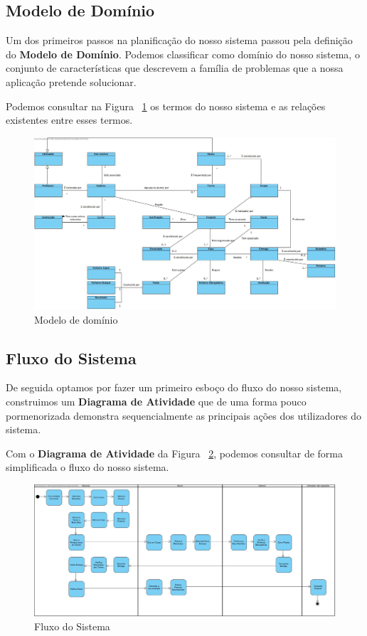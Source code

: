 \subsection{Modelo de Domínio}

Um dos primeiros passos na planificação do nosso sistema passou pela definição do \textbf{Modelo de Domínio}.
Podemos classificar como domínio do nosso sistema, o conjunto de características que descrevem a família de problemas que a nossa aplicação pretende solucionar.

Podemos consultar na Figura ~\ref{fig:modelo-dominio} os termos do nosso sistema e as relações existentes entre esses termos.

\begin{figure}[H] 
  \centering
  \includegraphics[width=1\textwidth,center]{images/arquitetura/modelo-dominio}
  \caption{Modelo de domínio}
  \label{fig:modelo-dominio}
\end{figure}

\subsection{Fluxo do Sistema}

De seguida optamos por fazer um primeiro esboço do fluxo do nosso sistema, construimos um \textbf{Diagrama de Atividade} que de uma forma pouco pormenorizada demonstra sequencialmente as principais ações dos utilizadores do sistema.

Com o \textbf{Diagrama de Atividade} da Figura ~\ref{fig:diagrama-blocos}, podemos consultar de forma simplificada o fluxo do nosso sistema.

\begin{figure}[H] 
  \centering
  \includegraphics[width=1\textwidth,center]{images/arquitetura/diagrama-blocos}
  \caption{Fluxo do Sistema}
  \label{fig:diagrama-blocos}
\end{figure}

